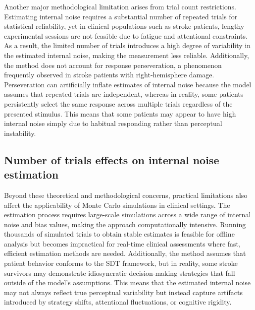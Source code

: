 Another major methodological limitation arises from trial count restrictions. Estimating internal noise requires a substantial number of repeated trials for statistical reliability, yet in clinical populations such as stroke patients, lengthy experimental sessions are not feasible due to fatigue and attentional constraints. As a result, the limited number of trials introduces a high degree of variability in the estimated internal noise, making the measurement less reliable. Additionally, the method does not account for response perseveration, a phenomenon frequently observed in stroke patients with right-hemisphere damage. Perseveration can artificially inflate estimates of internal noise because the model assumes that repeated trials are independent, whereas in reality, some patients persistently select the same response across multiple trials regardless of the presented stimulus. This means that some patients may appear to have high internal noise simply due to habitual responding rather than perceptual instability.



\subsection{Number of trials effects on internal noise estimation}

Beyond these theoretical and methodological concerns, practical limitations also affect the applicability of Monte Carlo simulations in clinical settings. The estimation process requires large-scale simulations across a wide range of internal noise and bias values, making the approach computationally intensive. Running thousands of simulated trials to obtain stable estimates is feasible for offline analysis but becomes impractical for real-time clinical assessments where fast, efficient estimation methods are needed. Additionally, the method assumes that patient behavior conforms to the SDT framework, but in reality, some stroke survivors may demonstrate idiosyncratic decision-making strategies that fall outside of the model’s assumptions. This means that the estimated internal noise may not always reflect true perceptual variability but instead capture artifacts introduced by strategy shifts, attentional fluctuations, or cognitive rigidity.

